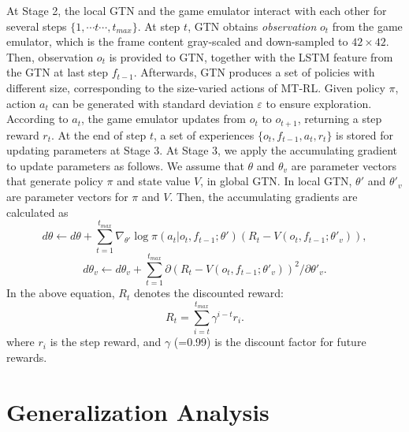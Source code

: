 \documentclass[letterpaper]{article} %
\begin{document}
At Stage 2, the local GTN and the game emulator interact with each other for several steps $\{1,\cdots t \cdots, t_{max}\}$.
At step $t$, GTN obtains \textit{observation} $o_t$ from the game emulator, which is the frame content gray-scaled and down-sampled to $42 \times 42$.
Then, observation $o_t$ is provided to GTN, together with the LSTM feature from the GTN at last step $f_{t-1}$.
Afterwards, GTN produces a set of policies with different size, corresponding to the size-varied actions of MT-RL.
Given policy $\pi$, action $a_t$ can be generated with standard deviation $\varepsilon$ to ensure exploration.
According to $a_t$, the game emulator updates from $o_t$ to $o_{t+1}$, returning a step reward $r_t$.
At the end of step $t$, a set of experiences $\{o_t,f_{t-1},a_t,r_t\}$ is stored for updating parameters at Stage 3.
At Stage 3, we apply the accumulating gradient to update parameters as follows. We assume that $\theta$ and $\theta_v$ are parameter vectors that generate policy $\pi$ and state value $V$, in global GTN. In local GTN, $\theta'$ and $\theta'_v$ are parameter vectors for $\pi$ and $V$. Then, the accumulating gradients are calculated as
\begin{equation}
\label{acc grad 1}
d\theta \leftarrow d \theta + \sum_{t=1}^{t_{max}} \nabla_{\theta'}\log\pi(a_t|o_t,f_{t-1};\theta')(R_t-V(o_t,f_{t-1};\theta'_v)),
\end{equation}
\begin{equation}
\label{acc grad 2}
d\theta_v \leftarrow d \theta_v + \sum_{t=1}^{t_{max}} \partial(R_t-V(o_t,f_{t-1};\theta'_v))^2/\partial\theta'_v.
\end{equation}
In the above equation, $R_t$ denotes the discounted reward:
 \begin{equation}
\label{R}
R_{t}=\sum_{i=t}^{t_{max}} \gamma^{i-t} r_{i}.
\end{equation}
where $r_i$ is the step reward, and $\gamma$ (=0.99) is the discount factor for future rewards.

\section{Generalization Analysis}
\label{section-generalization-analysis}
\end{document}
